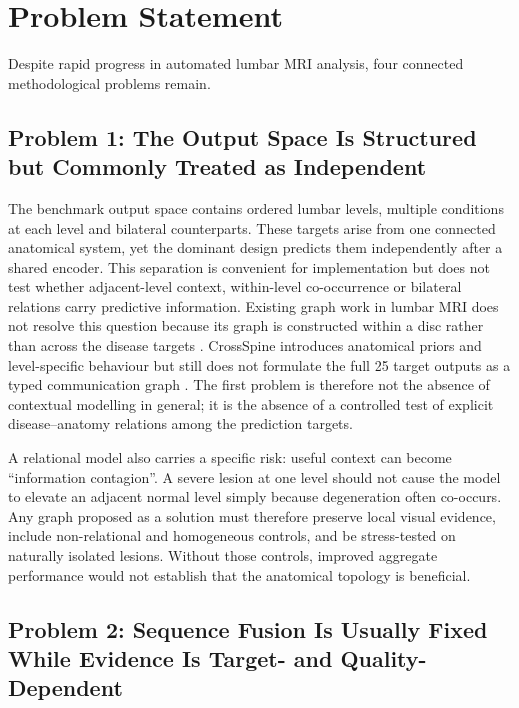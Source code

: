 \section{Problem Statement}
\label{sec:intro-problem}

Despite rapid progress in automated lumbar MRI analysis, four connected
methodological problems remain.

\subsection{Problem 1: The Output Space Is Structured but Commonly Treated as Independent}
\label{sec:intro-problem-relational}

The benchmark output space contains ordered lumbar levels, multiple conditions at
each level and bilateral counterparts. These targets arise from one connected
anatomical system, yet the dominant design predicts them independently after a
shared encoder. This separation is convenient for implementation but does not test
whether adjacent-level context, within-level co-occurrence or bilateral relations
carry predictive information. Existing graph work in lumbar MRI does not resolve
this question because its graph is constructed within a disc rather than across the
disease targets \cite{baur2024automated}. CrossSpine introduces anatomical priors
and level-specific behaviour but still does not formulate the full 25 target outputs
as a typed communication graph \cite{nguyen2026crossspine}. The first problem is
therefore not the absence of contextual modelling in general; it is the absence of a
controlled test of explicit disease--anatomy relations among the prediction targets.

A relational model also carries a specific risk: useful context can become
``information contagion''. A severe lesion at one level should not cause the model
to elevate an adjacent normal level simply because degeneration often co-occurs.
Any graph proposed as a solution must therefore preserve local visual evidence,
include non-relational and homogeneous controls, and be stress-tested on naturally
isolated lesions. Without those controls, improved aggregate performance would not
establish that the anatomical topology is beneficial.

\subsection{Problem 2: Sequence Fusion Is Usually Fixed While Evidence Is Target- and Quality-Dependent}
\label{sec:intro-problem-routing}

